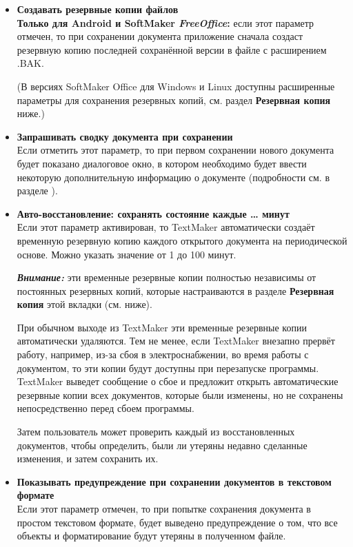 ﻿\documentclass[a4paper,10pt]{article}
\begin{document}
 \begin{itemize}
  \item \textbf{Создавать резервные копии файлов}\\  
  \textbf{Только для Android и SoftMaker \textit{FreeOffice}:} если этот параметр отмечен, то при сохранении документа приложение сначала создаст резервную копию последней сохранённой версии в файле с расширением .BAK.
  
  (В версиях SoftMaker Office для Windows и Linux доступны расширенные параметры для сохранения резервных копий, см. раздел \textbf{Резервная копия} ниже.)
  \item \textbf{Запрашивать сводку документа при сохранении}\\
  Если отметить этот параметр, то при первом сохранении нового документа будет показано диалоговое окно, в котором необходимо будет ввести некоторую дополнительную информацию о документе (подробности см. в разделе ).
  \item \textbf{Авто-восстановление: сохранять состояние каждые … минут}\\
  Если этот параметр активирован, то TextMaker автоматически создаёт временную резервную копию каждого открытого документа на периодической основе. Можно указать значение от 1 до 100 минут.
  
  \begin{mdframed}[backgroundcolor=blue!10]
\textbf{\textit{Внимание:}} эти временные резервные копии полностью независимы от постоянных резервных копий, которые настраиваются в разделе \textbf{Резервная копия} этой вкладки (см. ниже).
\end{mdframed}

При обычном выходе из TextMaker эти временные резервные копии автоматически удаляются. Тем не менее, если TextMaker внезапно прервёт работу, например, из-за сбоя в электроснабжении, во время работы с документом, то эти копии будут доступны при перезапуске программы. TextMaker выведет сообщение о сбое и предложит открыть автоматические резервные копии всех документов, которые были изменены, но не сохранены непосредственно перед сбоем программы.

Затем пользователь может проверить каждый из восстановленных документов, чтобы определить, были ли утеряны недавно сделанные изменения, и затем сохранить их.

\item \textbf{Показывать предупреждение при сохранении документов в текстовом формате}\\
Если этот параметр отмечен, то при попытке сохранения документа в простом текстовом формате, будет выведено предупреждение о том, что все объекты и форматирование будут утеряны в полученном файле.
 \end{itemize}
\end{document}
